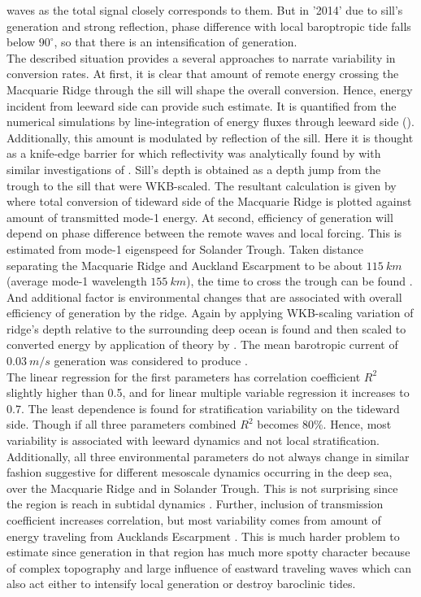 \documentclass[12pt]{article}
\begin{document}
waves as the total signal closely corresponds to them. But in '2014' due to sill's generation and  
strong reflection, phase difference with local baroptropic tide falls below 
$90^{\circ}$, so that there is an intensification of generation.\\
The described situation provides a several approaches to narrate variability in conversion rates. 
At first, it is clear that amount of remote energy crossing the Macquarie Ridge through the sill 
will 
shape the overall conversion. Hence, energy incident from leeward side can provide such 
estimate. It is quantified from the numerical simulations by line-integration of energy fluxes 
through leeward side (). Additionally, this amount is modulated by reflection of 
the 
sill. Here it is thought as a knife-edge barrier for which reflectivity was analytically found by  
\citep{larsen1969internal} with similar investigations of \citep{klymak2013parameterizing}.  
Sill's depth is obtained as a depth jump from the trough to the sill that were WKB-scaled. The 
resultant calculation is given by  where total conversion of tideward 
side 
of the Macquarie Ridge is plotted against amount of transmitted mode-1 energy. At second, 
efficiency 
of generation will depend on phase difference between the remote waves and local forcing. This is 
estimated from mode-1 eigenspeed for Solander Trough. Taken distance separating the Macquarie Ridge 
and Auckland Escarpment to be about $115~km$ (average mode-1 wavelength $155~km$), the time to 
cross the trough can be found . And additional factor is environmental 
changes that are associated with overall efficiency of generation by the ridge. Again by applying 
WKB-scaling variation of ridge's depth relative to the surrounding deep ocean is found and then 
scaled to converted energy by application of theory by \citep{st2003generation}. The 
mean barotropic current of $0.03~m/s$ generation was considered to produce 
.\\
The linear regression for the first parameters has correlation coefficient $R^2$ slightly higher 
than 0.5, and for linear multiple variable regression it increases to $0.7$. The least dependence 
is found for stratification variability on the tideward side. Though if all three parameters 
combined $R^2$ becomes $80\%$. Hence, most variability is associated with leeward dynamics and not 
local stratification. Additionally, all three environmental parameters do not always change in 
similar fashion suggestive for different mesoscale dynamics occurring in the deep sea, over 
the Macquarie Ridge and in Solander Trough. This is not surprising since the region is reach in 
subtidal dynamics \citep{smith2013interaction}. Further, inclusion of 
transmission coefficient increases correlation, but most variability comes from amount of energy 
traveling from Aucklands Escarpment 
. This is much harder problem to estimate since generation in that 
region has much more spotty character  because of complex topography and large 
influence of eastward traveling waves which can also act either to intensify local generation or 
destroy baroclinic tides.
\end{document}
